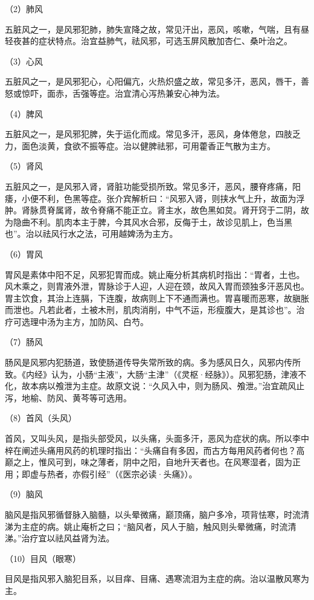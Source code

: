 \documentclass[draft,12pt]{ctexbook}
\begin{document}
（2）肺风

五脏风之一，是风邪犯肺，肺失宣降之故，常见汗出，恶风，咳嗽，气喘，且有昼轻夜甚的症状特点。治宜益肺气，祛风邪，可选玉屏风散加杏仁、桑叶治之。

（3）心风

五脏风之一，是风邪犯心，心阳偏亢，火热炽盛之故，常见多汗，恶风，唇干，善怒或惊吓，面赤，舌强等症。治宜清心泻热兼安心神为法。

（4）脾风

五脏风之一，是风邪犯脾，失于运化而成。常见多汗，恶风，身体倦怠，四肢乏力，面色淡黄，食欲不振等症。治以健脾祛邪，可用藿香正气散为主方。

（5）肾风

五脏风之一，是风邪入肾，肾脏功能受损所致。常见多汗，恶风，腰脊疼痛，阳痿，小便不利，色黑等症。张介宾解析曰：“风邪入肾，则挟水气上升，故面为浮肿。肾脉贯脊属肾，故令脊痛不能正立。肾主水，故色黑如炱。肾开窍于二阴，故为隐曲不利。肌肉本主于脾，今其风水合邪，反侮于土，故诊见肌上，色当黑也”。治以祛风行水之法，可用越婢汤为主方。

（6）胃风

胃风是素体中阳不足，风邪犯胃而成。姚止庵分析其病机时指出：“胃者，土也。风木乘之，则胄液外泄，胃脉诊于人迎，人迎在颈，故风入胃而颈独多汗恶风也。胃主饮食，其治上连膈，下连腹，故病则上下不通而满也。胃喜暖而恶寒，故䐜胀而泄也。凡若此者，土被木刑，肌肉消削，中气不运，形瘦腹大，是其诊也”。治疗可选理中汤为主方，加防风、白芍。

（7）肠风

肠风是风邪内犯肠道，致使肠道传导失常所致的病。多为感风日久，风邪内传所致。《内经》认为，小肠“主液”，大肠“主津”（《灵枢·经脉》）。风邪犯肠，津液不化，故本病以飧泄为主症。故原文说：“久风入中，则为肠风、飧泄。”治宜疏风止泻，地榆、防风、黄芩等可选用。

（8）首风（头风）

首风，又叫头风，是指头部受风，以头痛，头面多汗，恶风为症状的病。所以李中梓在阐述头痛用风药的机理时指出：“头痛自有多因，而古方每用风药者何也？高巅之上，惟风可到，味之薄者，阴中之阳，自地升天者也。在风寒湿者，固为正用；即虚与热者，亦假引经”（《医宗必读·头痛》）。

（9）脑风

脑风是指风邪循督脉入脑髓，以头晕微痛，巅顶痛，脑户多冷，项背怯寒，时流清涕为主症的病。姚止庵析之曰；“脑风者，风人于脑，触风则头晕微痛，时流清涕。”治疗宜以祛风益肾为法。

（10）目风（眼寒）

目风是指风邪入脑犯目系，以目痒、目痛、遇寒流泪为主症的病。治以温散风寒为主。
\end{document}
